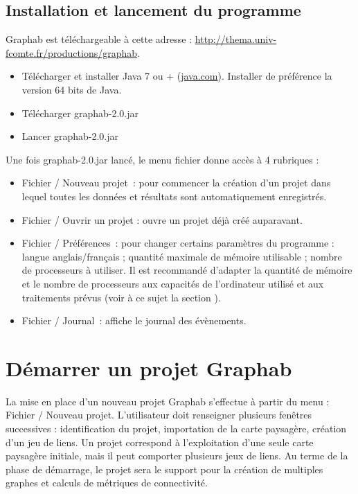 \documentclass{article}
\begin{document}
\subsection{Installation et lancement du programme}

Graphab est téléchargeable à cette adresse : \url{http://thema.univ-fcomte.fr/productions/graphab}.

\begin{itemize}
	\item Télécharger et installer Java 7 ou + (\href{http://www.java.com}{java.com}). Installer de préférence la version 64 bits de Java.
	\item Télécharger graphab-2.0.jar
	\item Lancer graphab-2.0.jar
\end{itemize}

Une fois graphab-2.0.jar lancé, le menu fichier donne accès à 4 rubriques : 
\begin{itemize}
	\item Fichier / Nouveau projet~: pour commencer la création d’un projet dans lequel toutes les données et résultats sont automatiquement enregistrés.
	\item Fichier / Ouvrir un projet : ouvre un projet déjà créé auparavant.
	\item Fichier / Préférences~: pour changer certains paramètres du programme : langue anglais/français ; quantité maximale de mémoire utilisable ; nombre de processeurs à utiliser. Il est recommandé d’adapter la quantité de mémoire et le nombre de processeurs aux capacités de l’ordinateur utilisé et aux traitements prévus (voir à ce sujet la section ).  
	\item Fichier / Journal~: affiche le journal des évènements.
\end{itemize}

\section{Démarrer un projet Graphab}

La mise en place d’un nouveau projet Graphab s’effectue à partir du menu : Fichier / Nouveau projet. L’utilisateur doit renseigner plusieurs fenêtres successives : identification du projet, importation de la carte paysagère, création d’un jeu de liens. Un projet correspond à l’exploitation d’une seule carte paysagère initiale, mais il peut comporter plusieurs jeux de liens. Au terme de la phase de démarrage, le projet sera le support pour la création de multiples graphes et calculs de métriques de connectivité.
\end{document}
